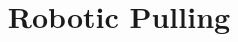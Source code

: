 \documentclass[conference]{IEEEtran}
\begin{document}
\title{Robotic Pulling}






% 


\maketitle
\end{document}
